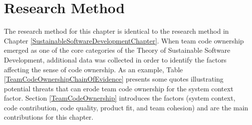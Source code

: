 \section{Research Method}
\label{TeamCodeOwnershipResearchMethod}

The research method for this chapter is identical to the research method in Chapter \ref{SustainableSoftwareDevelopmentChapter}. When team code ownership emerged as one of the core categories of the Theory of Sustainable Software Development, additional data was collected in order to identify the factors affecting the sense of code ownership. As an example, Table \ref{TeamCodeOwnershipChainOfEvidence} presents  some quotes illustrating potential threats that can erode team code ownership for the system context factor. Section \ref{TeamCodeOwnership} introduces the factors (system context, code contribution, code quality, product fit, and team cohesion) and are the main contributions for this chapter.  


